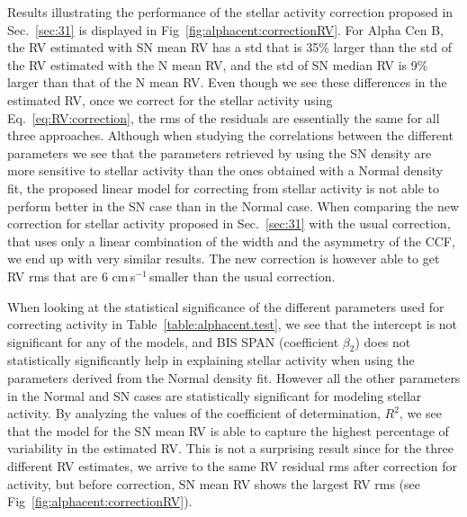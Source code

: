 \documentclass{aa}
\def\cms{\hbox{\,cm\,s$^{-1}$}}       %
\begin{document}
Results illustrating the performance of the stellar activity correction proposed in Sec.~\ref{sec:31} is displayed in Fig~\ref{fig:alphacent:correctionRV}. 
For Alpha Cen B, the RV estimated with SN mean RV has a std that is 35\% larger than the std of the RV estimated with the N mean RV, and the std of SN median RV is 9\% larger than that of the N mean RV.
Even though we see these differences in the estimated RV, once we correct for the stellar activity using Eq.~\ref{eq:RV:correction}, 
the rms of the residuals are essentially the same for all three approaches.
Although when studying the correlations between the different parameters we see that the parameters retrieved by using the SN density are more sensitive to stellar activity than the ones obtained with a Normal density fit,
the proposed linear model for correcting from stellar activity is not able to perform better in the SN case than in the Normal case. When comparing the new correction for stellar activity proposed in Sec.~\ref{sec:31} with the usual correction, that uses only a linear combination of the width and the asymmetry of the CCF, we end up with very similar results. The new correction is however able to get RV rms that are 6\,\cms\,smaller than the usual correction.


When looking at the statistical significance of the different parameters used for correcting activity in Table~\ref{table:alphacent.test}, we see that the intercept is not significant for any of the models, and BIS SPAN (coefficient $\beta_2$) does not statistically significantly help in explaining stellar activity when using the parameters derived from the Normal density fit. 
However all the other parameters in the Normal and SN cases are statistically significant for modeling stellar activity. 
By analyzing the values of the coefficient of determination, $R^2$, we see that the model for the SN mean RV is able to capture the highest percentage of variability in the estimated RV. 
This is not a surprising result since for the three different RV estimates, we arrive to the same RV residual rms after correction for activity, but before correction, SN mean RV shows the largest RV rms (see Fig~\ref{fig:alphacent:correctionRV}).
\end{document}
